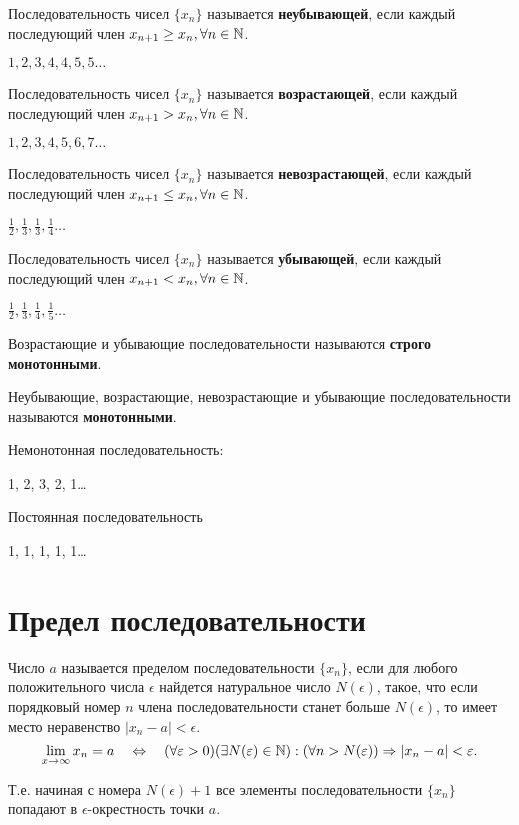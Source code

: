 Последовательность чисел $\{x_{n}\}$ называется \textbf{неубывающей}, если каждый последующий член $x_{n+1} \ge x_{n}, \forall n\in \mathbb{N}$.
\begin{eg}
  $1, 2, 3, 4, 4, 5, 5\ldots$
\end{eg}

Последовательность чисел $\{x_{n}\} $ называется \textbf{возрастающей}, если каждый последующий член $x_{n+1} > x_{n}, \forall n \in \mathbb{N}$.
\begin{eg}
  $1, 2, 3, 4, 5, 6, 7\ldots$
\end{eg}

Последовательность чисел $\{x_{n}\} $ называется \textbf{невозрастающей}, если каждый последующий член $x_{n+1} \le x_{n}, \forall n \in \mathbb{N}$.
\begin{eg}
  $\frac{1}{2}, \frac{1}{3}, \frac{1}{3}, \frac{1}{4}\ldots $
\end{eg}

Последовательность чисел $\{x_{n}\} $ называется \textbf{убывающей}, если каждый последующий член $x_{n+1} < x_{n}, \forall n \in \mathbb{N}$.
\begin{eg}
  $\frac{1}{2}, \frac{1}{3}, \frac{1}{4}, \frac{1}{5}\ldots$
\end{eg}

Возрастающие и убывающие последовательности называются \textbf{строго монотонными}.

Неубывающие, возрастающие, невозрастающие и убывающие последовательности называются \textbf{монотонными}.

Немонотонная последовательность:
\begin{eg}
  1, 2, 3, 2, 1\ldots
\end{eg}

Постоянная последовательность
\begin{eg}
  1, 1, 1, 1, 1\ldots
\end{eg}

\section{Предел последовательности}

\begin{definition}
Число $a$ называется пределом последовательности $\{x_{n}\} $, если для любого положительного числа $\epsilon$ найдется натуральное число  $N\left(\epsilon  \right) $, такое, что если порядковый номер $n$ члена последовательности станет больше $N(\epsilon)$, то имеет место неравенство  $|x_{n} - a| < \epsilon$.
\[
\lim_{x \to \infty} x_{n} = a \quad \iff \quad
(\forall \epsilon > 0)(\exists N(\epsilon) \in \N) : (\forall n > N(\epsilon)) \implies |x_{n}-a| < \epsilon
.\] 
\end{definition}
\begin{note}
  Т.е. начиная с номера $N(\epsilon) + 1$ все элементы последовательности $\{x_{n}\} $ попадают в $\epsilon$-окрестность точки $a$.
\end{note}

